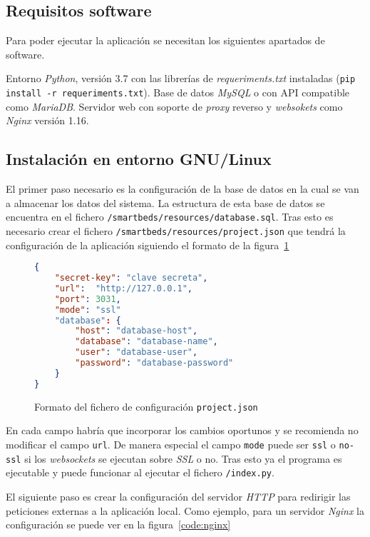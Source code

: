 \subsection{Requisitos software}

Para poder ejecutar la aplicación se necesitan los siguientes apartados de software.

Entorno \textit{Python}, versión 3.7 con las librerías de \textit{requeriments.txt} instaladas (\texttt{pip install -r requeriments.txt}).
Base de datos \textit{MySQL} o con API compatible como \textit{MariaDB}. Servidor web con soporte de \textit{proxy} reverso y \textit{websokets} como \textit{Nginx} versión 1.16.

\subsection{Instalación en entorno GNU/Linux}\label{sec:instalacion}

El primer paso necesario es la configuración de la base de datos en la cual se van a almacenar los datos del sistema. La estructura de esta base de datos se encuentra en el fichero \texttt{/smartbeds/resources/database.sql}. Tras esto es necesario crear el fichero \texttt{/smartbeds/resources/project.json} que tendrá la configuración de la aplicación siguiendo el formato de la figura~\ref{code:projectjson}

\begin{figure}
	\centering
	\begin{lstlisting}[language=JSON]
{
	"secret-key": "clave secreta",
	"url":  "http://127.0.0.1",
	"port": 3031,
	"mode": "ssl"
	"database": {
		"host": "database-host",
		"database": "database-name",
		"user": "database-user",
		"password": "database-password"
	}
}
	\end{lstlisting}
	\caption{Formato del fichero de configuración \texttt{project.json}}
	\label{code:projectjson}
\end{figure}

En cada campo habría que incorporar los cambios oportunos y se recomienda no modificar el campo \texttt{url}. De manera especial el campo \texttt{mode} puede ser \texttt{ssl} o \texttt{no-ssl} si los \textit{websockets} se ejecutan sobre \textit{SSL} o no. Tras esto ya el programa es ejecutable y puede funcionar al ejecutar el fichero \texttt{/index.py}.

El siguiente paso es crear la configuración del servidor \textit{HTTP} para redirigir las peticiones externas a la aplicación local. Como ejemplo, para un servidor \textit{Nginx} la configuración se puede ver en la figura~\ref{code:nginx}

